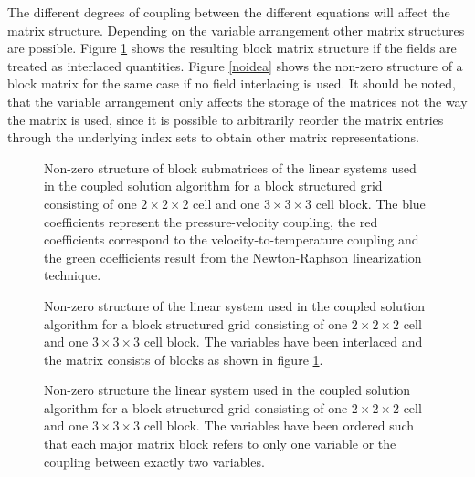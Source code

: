 The different degrees of coupling between the different equations will affect the matrix structure. Depending on the variable arrangement other matrix structures are possible. Figure \ref{fig:cpldassemble} shows the resulting block matrix structure if the fields are treated as interlaced quantities. Figure \ref{noidea} shows the non-zero structure of a block matrix for the same case if no field interlacing is used. It should be noted, that the variable arrangement only affects the storage of the matrices not the way the matrix is used, since it is possible to arbitrarily reorder the matrix entries through the underlying index sets to obtain other matrix representations.

\begin{figure}
  \centering
  \label{fig:cpldassemble}
  
  \caption{Non-zero structure of block submatrices of the linear systems used in the coupled solution algorithm for a block structured grid consisting of one $2\times2\times2$ cell and one $3\times3\times3$ cell block. The blue coefficients represent the pressure-velocity coupling, the red coefficients correspond to the velocity-to-temperature coupling and the green coefficients result from the Newton-Raphson linearization technique.}
\end{figure}

\begin{figure}
  \centering
  
  \caption{Non-zero structure of the linear system used in the coupled solution algorithm for a block structured grid consisting of one $2\times2\times2$ cell and one $3\times3\times3$ cell block. The variables have been interlaced and the matrix consists of blocks as shown in figure \ref{fig:cpldassemble}.}
\end{figure}

\begin{figure}
  \centering
   
  \caption{Non-zero structure the linear system used in the coupled solution algorithm for a block structured grid consisting of one $2\times2\times2$ cell and one $3\times3\times3$ cell block. The variables have been ordered such that each major matrix block refers to only one variable or the coupling between exactly two variables.}
  \label{fig:nointerlacemat}
\end{figure}
